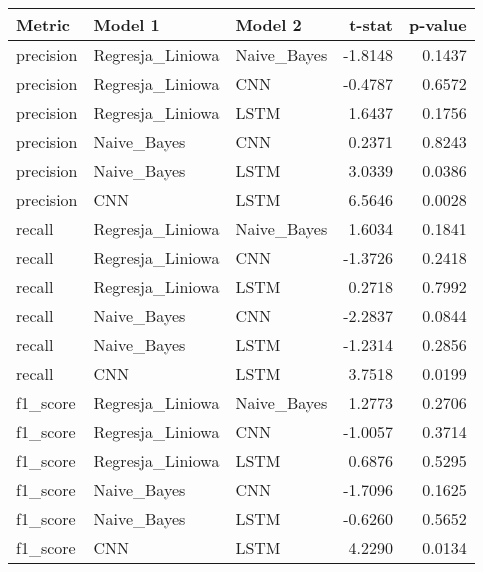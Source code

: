 \begin{tabular}{lllrr}
\toprule
Metric & Model 1 & Model 2 & t-stat & p-value \\
\midrule
precision & Regresja_Liniowa & Naive_Bayes & -1.8148 & 0.1437 \\
precision & Regresja_Liniowa & CNN & -0.4787 & 0.6572 \\
precision & Regresja_Liniowa & LSTM & 1.6437 & 0.1756 \\
precision & Naive_Bayes & CNN & 0.2371 & 0.8243 \\
precision & Naive_Bayes & LSTM & 3.0339 & 0.0386 \\
precision & CNN & LSTM & 6.5646 & 0.0028 \\
recall & Regresja_Liniowa & Naive_Bayes & 1.6034 & 0.1841 \\
recall & Regresja_Liniowa & CNN & -1.3726 & 0.2418 \\
recall & Regresja_Liniowa & LSTM & 0.2718 & 0.7992 \\
recall & Naive_Bayes & CNN & -2.2837 & 0.0844 \\
recall & Naive_Bayes & LSTM & -1.2314 & 0.2856 \\
recall & CNN & LSTM & 3.7518 & 0.0199 \\
f1_score & Regresja_Liniowa & Naive_Bayes & 1.2773 & 0.2706 \\
f1_score & Regresja_Liniowa & CNN & -1.0057 & 0.3714 \\
f1_score & Regresja_Liniowa & LSTM & 0.6876 & 0.5295 \\
f1_score & Naive_Bayes & CNN & -1.7096 & 0.1625 \\
f1_score & Naive_Bayes & LSTM & -0.6260 & 0.5652 \\
f1_score & CNN & LSTM & 4.2290 & 0.0134 \\
\bottomrule
\end{tabular}
